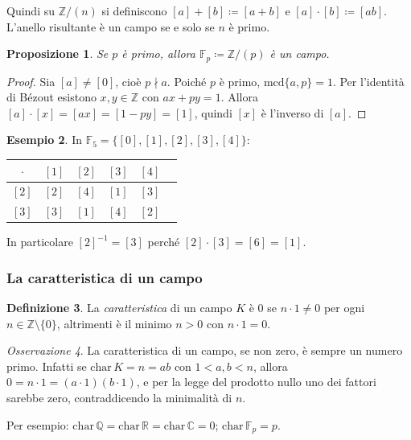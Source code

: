 \documentclass[11pt, a4paper]{book}
\theoremstyle{definition}
\newtheorem{definizione}{Definizione}[section]
\newtheorem{esempio}[definizione]{Esempio}
\theoremstyle{plain}
\newtheorem{proposizione}[definizione]{Proposizione}
\theoremstyle{remark}
\newtheorem{osservazione}[definizione]{Osservazione}
\newcommand{\Z}{\mathbb{Z}}
\newcommand{\Q}{\mathbb{Q}}
\newcommand{\R}{\mathbb{R}}
\newcommand{\C}{\mathbb{C}}
\newcommand{\mcd}{\mathrm{mcd}}
\begin{document}
Quindi su $\Z/(n)$ si definiscono $[a] + [b] \coloneqq [a+b]$ e $[a] \cdot [b] \coloneqq [ab]$. L'anello risultante è un campo se e solo se $n$ è primo.

\begin{proposizione}
Se $p$ è primo, allora $\mathbb{F}_p \coloneqq \Z/(p)$ è un campo.
\end{proposizione}

\begin{proof}
Sia $[a] \neq [0]$, cioè $p \nmid a$. Poiché $p$ è primo, $\mcd\{a, p\} = 1$. Per l'identità di Bézout esistono $x, y \in \Z$ con $ax + py = 1$. Allora $[a] \cdot [x] = [ax] = [1 - py] = [1]$, quindi $[x]$ è l'inverso di $[a]$.
\end{proof}

\begin{exbox}
\begin{esempio}
In $\mathbb{F}_5 = \{[0],[1],[2],[3],[4]\}$:
\begin{center}
\begin{tabular}{c|ccccc}
  $\cdot$ & $[1]$ & $[2]$ & $[3]$ & $[4]$ \\
  \hline
  $[2]$   & $[2]$ & $[4]$ & $[1]$ & $[3]$ \\
  $[3]$   & $[3]$ & $[1]$ & $[4]$ & $[2]$ \\
\end{tabular}
\end{center}
In particolare $[2]^{-1} = [3]$ perché $[2] \cdot [3] = [6] = [1]$.
\end{esempio}
\end{exbox}

\subsubsection{La caratteristica di un campo}

\begin{defbox}
\begin{definizione}
La \emph{caratteristica} di un campo $K$ è $0$ se $n \cdot 1 \neq 0$ per ogni $n \in \Z \setminus \{0\}$, altrimenti è il minimo $n > 0$ con $n \cdot 1 = 0$.
\end{definizione}
\end{defbox}

\begin{osservazione}
La caratteristica di un campo, se non zero, è sempre un numero primo. Infatti se $\mathrm{char}\, K = n = ab$ con $1 < a, b < n$, allora $0 = n \cdot 1 = (a \cdot 1)(b \cdot 1)$, e per la legge del prodotto nullo uno dei fattori sarebbe zero, contraddicendo la minimalità di $n$.

Per esempio: $\mathrm{char}\, \Q = \mathrm{char}\, \R = \mathrm{char}\, \C = 0$; $\mathrm{char}\, \mathbb{F}_p = p$.
\end{osservazione}
\end{document}
